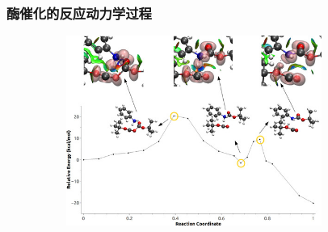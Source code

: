 \frame
{
	\frametitle{酶催化的反应动力学过程}
\begin{figure}[h!]
\centering
\vspace{-5.5pt}
\includegraphics[height=2.45in,width=4.00in,viewport=0 0 180 135,clip]{Figures/molecules-reaction-path.jpg}
\label{enzyem-reaction-path-2}
\end{figure}
}

